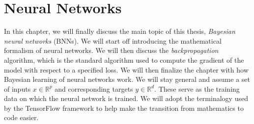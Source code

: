 \section{Neural Networks}\label{sec:neural_networks}
In this chapter, we will finally discuss the main topic of this thesis, \textit{Bayesian neural networks} (BNNs).
We will start off introducing the mathematical formalism of neural networks. 
We will then discuss the \textit{backpropagation} algorithm, which is the standard
algorithm used to compute the gradient of the model with respect to a specified loss. 
We will then finalize the chapter with how Bayesian learning of neural networks work. We will stay general and assume a set of inputs $x \in \mathbb{R}^p$ and corresponding targets $y \in \mathbb{R}^d$. 
These serve as the training data on which the neural network is trained.
We will adopt the terminalogy used by the TensorFlow framework \cite{tf} to help make the
transition from mathematics to code easier. 

